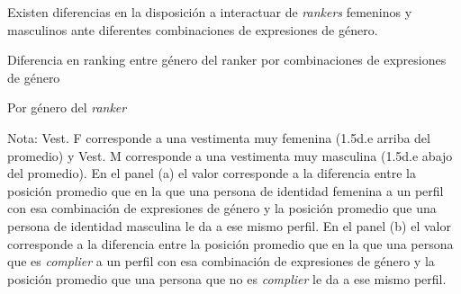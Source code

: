 \begin{result}
Existen diferencias en la disposición a interactuar de \textit{rankers} femeninos y masculinos ante diferentes combinaciones de expresiones de género. 
\end{result}

\begin{table}
    \centering
    \caption{Diferencia en ranking entre género del ranker por combinaciones de expresiones de género}
    \label{tab:Diffs}
    \begin{subtable}{0.49\textwidth}
    \centering
    \caption{Por género del \textit{ranker}}
    \fontsize{9.5}{12}
    \end{subtable}
    \begin{subtable}{0.49\textwidth}
    \centering
    \caption{Por \textit{compliance} del \textit{ranker}}
    \fontsize{9.5}{12}
    \end{subtable}
    \begin{threeparttable} 
    \begin{tablenotes}
    \scriptsize{
    \item Nota: Vest. F corresponde a una vestimenta muy femenina (1.5d.e arriba del promedio) y Vest. M corresponde a una vestimenta muy masculina (1.5d.e abajo del promedio). En el panel (a) el valor corresponde a la diferencia entre la posición promedio que en la que una persona de identidad femenina a un perfil con esa combinación de expresiones de género y la posición promedio que una persona de identidad masculina le da a ese mismo perfil. En el panel (b) el valor corresponde a la diferencia entre la posición promedio que en la que una persona que es \textit{complier} a un perfil con esa combinación de expresiones de género y la posición promedio que una persona que no es \textit{complier} le da a ese mismo perfil.}
    \end{tablenotes}
    \end{threeparttable}
\end{table}

